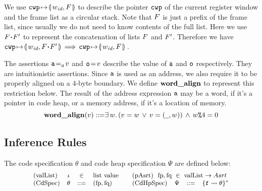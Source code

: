 We use $\texttt{cwp}\!\mapsto\!\llparenthesis\, w_{\textit{id}},F\,\rrparenthesis$ to describe the pointer
$\texttt{cwp}$ of the current register window and the frame
list as a circular stack.
Note that $F$ is just a prefix of the frame list,
since usually we do not need to know contents of
the full list. Here we use $F \!\bm{\cdot}\! F'$ to
represent the concatenation of lists $F$ and $F'$.
Therefore we have
$
\texttt{cwp}\!\mapsto\!\llparenthesis\, w_{\textit{id}},F \!\bm{\cdot}\! F'\,\rrparenthesis \,\Longrightarrow\,
\texttt{cwp}\!\mapsto\!\llparenthesis\, w_{\textit{id}},F\,\rrparenthesis
$\,.


The assertions ${\texttt{a}}\!=_{a}\!{v}$ and ${\texttt{o}}\!=\!{v}$
describe the value of $\texttt{a}$ and $\texttt{o}$ respectively. They are
intuitionistic assertions. Since $\texttt{a}$ is used as an address,
we also require it to be properly aligned on a 4-byte boundary. 
We define $\textbf{word\_align}{}$ to represent this restriction below. 
The result of the address expression $\texttt{a}$ may be a word, if 
it's a pointer in code heap, or a memory address, if it's a location 
of memory. 
\[
	\textbf{word\_align}{(v)} ::\!\!{=}
	\exists \, w. \, 
	(v = w \, \lor \, v = (\underline{\ \,}, w))
	\, \land \, w\texttt{\%}{4} = 0 
\]

\subsection{Inference Rules}
\label{subsec:inference rules}
\newcommand{\tinybftext}[1]{\textbf{\scriptsize{#1}}}


The code specification $\theta$ and code heap specification $\Psi$
are defined below:
\[
	\small
	\begin{array}{lccllccl}
		\text{(valList)} & \lgvl & \in & \text{list value} 
			& 
		\multicolumn{4}{l}
		{
			\quad
			\text{(pAsrt)} \ \
			\specpre,\specpost \ \in \ 
			\text{valList} \rightarrow Asrt
		}
		\\
		
		\text{(CdSpec)} & \Bspec & ::= & (\specpre, \specpost) 
			& \quad
		
		\text{(CdHpSpec)} & \Cspec & ::= & \{\lab{} \rightsquigarrow \Bspec\}^{*}
	\end{array}
\]


